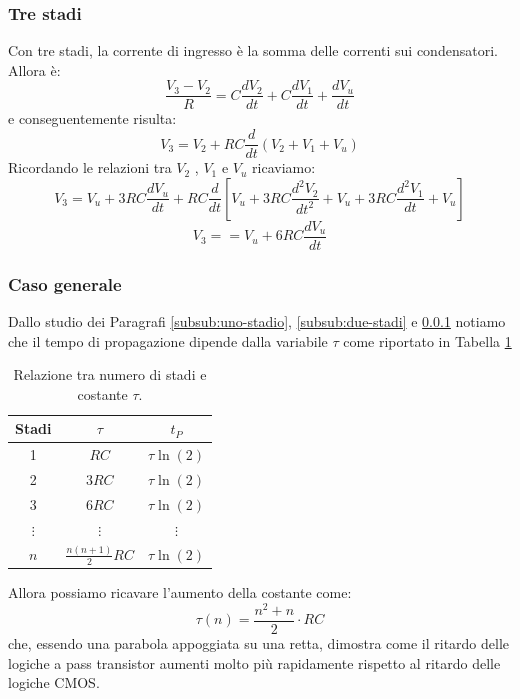 \documentclass[../main.tex]{subfiles}
\begin{document}
	\subsubsection{Tre stadi}
	\label{subsub:tre-stadi}
	Con tre stadi, la corrente di ingresso è la somma delle correnti sui condensatori.\\
	Allora è:
	\[ \frac {V _ {3} - V _ {2}}{R} = C \frac {d V _ {2}}{d t} + C \frac {d V _ {1}}{d t} + \frac {d V _ {u}}{d t} \]
	e conseguentemente risulta:
	\[ V _ {3} = V _ {2} + R C \frac {d}{d t} \left(V _ {2} + V _ {1} + V _ {u}\right) \]
	Ricordando le relazioni tra  \( V_{2} \) ,  \( V_{1} \)  e  \( V_{u} \)  ricaviamo:
	$$V_3 = V_u + 3RC \frac{dV_u}{dt} + RC \frac{d}{dt} \left[ V_u + 3RC \frac{d^2V_2}{dt^2} + V_u + 3RC \frac{d^2V_1}{dt} + V_u \right]$$
	$$V_3 = = V_u + 6RC \frac{dV_u}{dt}$$
	\subsubsection{Caso generale}
	Dallo studio dei Paragrafi \ref{subsub:uno-stadio}, \ref{subsub:due-stadi} e \ref{subsub:tre-stadi} notiamo che il tempo di propagazione dipende dalla variabile $\tau$ come riportato in Tabella \ref{tab:table-18}
	\begin{table}[ht]
		\centering
		\begin{tabular}{ccc}
			\hline
			\textbf{Stadi} & $\tau$ & $t_P$ \\
			\hline
			1 & $RC$ & $\tau \ln(2)$ \\
			2 & $3RC$ & $\tau \ln(2)$ \\
			3 & $6RC$ & $\tau \ln(2)$ \\
			$\vdots$ & $\vdots$ & $\vdots$ \\
			$n$ & $\frac{n(n+1)}{2}RC$ & $\tau \ln(2)$ \\
			\hline
		\end{tabular}
		\caption{Relazione tra numero di stadi e costante $\tau$.}
		\label{tab:table-18}
	\end{table}
	Allora possiamo ricavare l'aumento della costante come:
	$$\tau(n) = \frac{n^2 + n}{2} \cdot RC$$
	che, essendo una parabola appoggiata su una retta, dimostra come il ritardo delle logiche a pass transistor aumenti molto più rapidamente rispetto al ritardo delle logiche CMOS.
\end{document}

